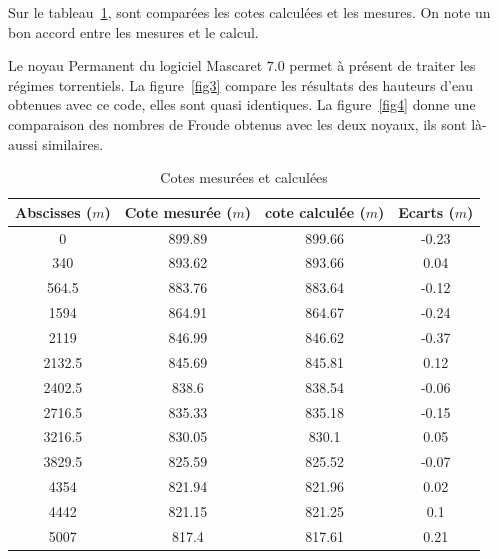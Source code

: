 \documentclass[a4paper,10pt]{article}
\begin{document}
Sur le tableau~\ref{tab1}, sont comparées les cotes calculées et les mesures. On note un bon accord entre les mesures et le calcul.

Le noyau Permanent du logiciel Mascaret $7.0$ permet à présent de traiter les régimes torrentiels. La figure~\ref{fig3} compare les résultats des hauteurs d'eau obtenues
avec ce code, elles sont quasi identiques. La figure~\ref{fig4} donne une comparaison des nombres de Froude obtenus avec les deux noyaux, ils sont là-aussi similaires.



\begin{center}
 \begin{table}
 \caption{Cotes mesurées et calculées}
 \label{tab1}
 \centering
 \begin{tabular}{|c|c|c|c|}
  \hline
  Abscisses ($m$) & Cote mesurée ($m$) & cote calculée ($m$) & Ecarts ($m$) \\
  \hline \hline
  0 & 899.89 & 899.66 & -0.23 \\
  340 & 893.62 & 893.66 & 0.04 \\
  564.5 & 883.76 & 883.64 & -0.12 \\
  1594 & 864.91 & 864.67 & -0.24 \\
  2119 & 846.99 & 846.62 & -0.37 \\
  2132.5 & 845.69 & 845.81 & 0.12 \\
  2402.5 & 838.6 & 838.54 & -0.06 \\
  2716.5 & 835.33 & 835.18 & -0.15 \\
  3216.5 & 830.05 & 830.1 & 0.05 \\
  3829.5 & 825.59 & 825.52 & -0.07 \\
  4354 & 821.94 & 821.96 & 0.02 \\
  4442 & 821.15 & 821.25 & 0.1 \\
  5007 & 817.4 & 817.61 & 0.21 \\
  \hline
 \end{tabular}
 \end{table}
\end{center}

\newpage
~
\end{document}

